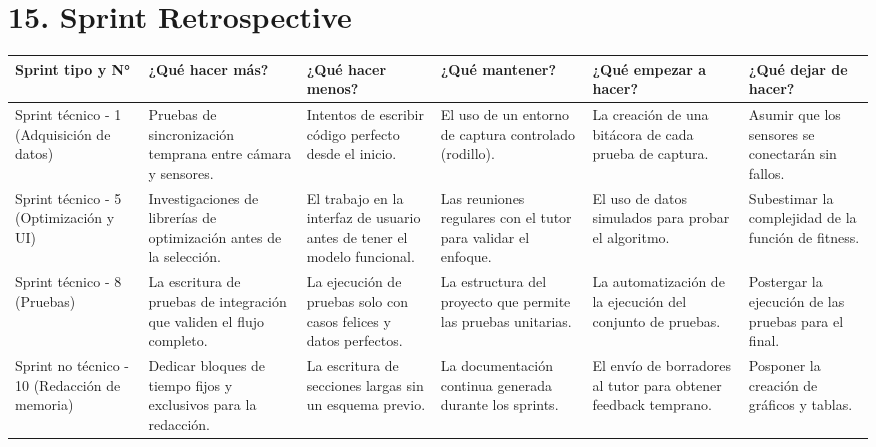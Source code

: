 \documentclass[
11pt, %
]{charter}
\begin{document}
\section{15. Sprint Retrospective}    
\label{sec:sprint_retro}

\begin{table}[htpb]
\renewcommand{\arraystretch}{1.5}
\centering
\begin{tabular}{|>{\raggedright\arraybackslash}p{2.5cm}|
                >{\raggedright\arraybackslash}p{2.2cm}|
                >{\raggedright\arraybackslash}p{2.2cm}|
                >{\raggedright\arraybackslash}p{2.2cm}|
                >{\raggedright\arraybackslash}p{2.2cm}|
                >{\raggedright\arraybackslash}p{2.2cm}|}
\hline
\rowcolor[HTML]{CCCCCC} 
Sprint tipo y N° & ¿Qué hacer más? & ¿Qué hacer menos? & ¿Qué mantener? & ¿Qué empezar a hacer? & ¿Qué dejar de hacer? \\
\hline
Sprint técnico - 1 (Adquisición de datos) & Pruebas de sincronización temprana entre cámara y sensores. & Intentos de escribir código perfecto desde el inicio. & El uso de un entorno de captura controlado (rodillo). & La creación de una bitácora de cada prueba de captura. & Asumir que los sensores se conectarán sin fallos. \\
\hline
Sprint técnico - 5 (Optimización y UI) & Investigaciones de librerías de optimización antes de la selección. & El trabajo en la interfaz de usuario antes de tener el modelo funcional. & Las reuniones regulares con el tutor para validar el enfoque. & El uso de datos simulados para probar el algoritmo. & Subestimar la complejidad de la función de fitness. \\
\hline
Sprint técnico - 8 (Pruebas) & La escritura de pruebas de integración que validen el flujo completo. & La ejecución de pruebas solo con casos felices y datos perfectos. & La estructura del proyecto que permite las pruebas unitarias. & La automatización de la ejecución del conjunto de pruebas. & Postergar la ejecución de las pruebas para el final. \\
\hline
Sprint no técnico - 10 (Redacción de memoria) & Dedicar bloques de tiempo fijos y exclusivos para la redacción. & La escritura de secciones largas sin un esquema previo. & La documentación continua generada durante los sprints. & El envío de borradores al tutor para obtener feedback temprano. & Posponer la creación de gráficos y tablas. \\
\hline
\end{tabular}
\end{table}
\end{document}
